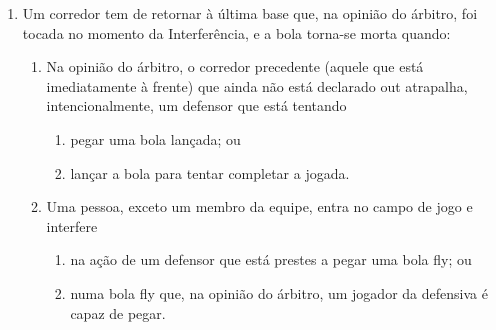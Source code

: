 \begin{multicols}{2}
\begin{enumerate}[label=\alph*)]
		\item Um corredor tem de retornar \`a \'ultima base que, na opini\~ao do \'arbitro, foi tocada no momento da Interfer\^encia, e a bola torna-se morta quando: 
		
		\begin{enumerate}[label = \roman*.]
			\item Na opini\~ao do \'arbitro, o corredor precedente (aquele que est\'a imediatamente \`a frente) que ainda n\~ao est\'a declarado \gls{out} atrapalha, intencionalmente, um defensor que est\'a tentando 
			
			\begin{enumerate}[label = \arabic*)]
				\item pegar uma bola lan\c{c}ada; ou 
				\item lan\c{c}ar a bola para tentar completar a jogada. 
			\end{enumerate}		
			\item Uma pessoa, exceto um membro da equipe, entra no campo de jogo e 
			interfere 
			\begin{enumerate}[label = \arabic*)]
				\item na a\c{c}\~ao de um defensor que est\'a prestes a pegar uma bola \gls{fly}; ou 
				\item numa bola \gls{fly} que, na opini\~ao do \'arbitro, um jogador da defensiva \'e capaz de pegar. 
			\end{enumerate}	
		\end{enumerate}
		
	\end{enumerate}
\end{multicols}
